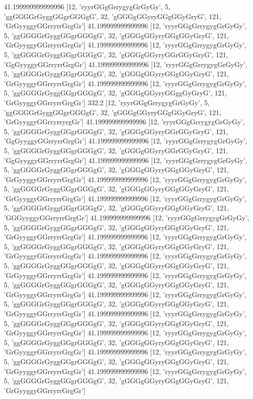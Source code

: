 41.199999999999996 [12, 'ryyrGGgGrrygygGrGyGy', 5, 'ggGGGGrGyggGGgrGGGgG', 32, 'gGGGgGGyryGGgGGyGryG', 121, 'GrGyyggyGGrryrrGrgGr']
41.199999999999996 [12, 'ryyrGGgGrrygygGrGyGy', 5, 'ggGGGGrGyggGGgrGGGgG', 32, 'gGGGgGGyryGGgGGyGryG', 121, 'GrGyyggyGGrryrrGrgGr']
41.199999999999996 [12, 'ryyrGGgGrrygygGrGyGy', 5, 'ggGGGGrGyggGGgrGGGgG', 32, 'gGGGgGGyryGGrGGyGryG', 121, 'GgGyyggyGGrryrrGrgGr']
41.199999999999996 [12, 'ryyrGGgGrrygygGrGyGy', 5, 'ggGGGGrGyggGGgrGGGgG', 32, 'gGGGgGGyryGGgGGyGryG', 121, 'GrGyyggyGGrryrrGrgGr']
41.199999999999996 [12, 'ryyrGGgGrrygygGrGyGy', 5, 'ggGGGGrGyggGGgrGGGgG', 32, 'gGGGgGGyryGGggGyGryG', 121, 'GrGyyggyGGrryrrGrgGr']
332.2 [12, 'ryyrGGgGrrygygGrGyGy', 5, 'ggGGGGrGyggGGgrGGGgG', 32, 'gGGGgGGyryGGgGGyGryG', 121, 'GrGyyggyGGrryrryrgGr']
41.199999999999996 [12, 'ryyrGGgGrrygygGrGyGy', 5, 'ggGGGGrGyggGGgrGGGgG', 32, 'gGGGgGGyryGGrGGyGryG', 121, 'GgGyyggyGGrryrrGrgGr']
41.199999999999996 [12, 'ryyrGGgGrrygygGrGyGy', 5, 'ggGGGGrGyggGGgrGGGgG', 32, 'gGGGgGGyryGGrGGyGryG', 121, 'GgGyyggyGGrryrrGrgGr']
41.199999999999996 [12, 'ryyrGGgGrrygygGrGyGy', 5, 'ggGGGGrGyggGGgrGGGgG', 32, 'gGGGgGGyryGGgGGyGryG', 121, 'GrGyyggyGGrryrrGrgGr']
41.199999999999996 [12, 'ryyrGGgGrrygygGrGyGy', 5, 'ggGGGGrGyggGGgrGGGgG', 32, 'gGGGgGGyryGGgGGyGryG', 121, 'GrGyyggyGGrryrrGrgGr']
41.199999999999996 [12, 'ryyrGGgGrrygygGrGyGy', 5, 'ggGGGGrGyggGGgrGGGgG', 32, 'gGGGgGGyryGGgGGyGryG', 121, 'GGGyyggyGGrryrrGrgGr']
41.199999999999996 [12, 'ryyrGGgGrrygygGrGyGy', 5, 'ggGGGGrGyggGGgrGGGgG', 32, 'gGGGgGGyryGGgGGyGryG', 121, 'GrGyyggyGGrryrrGrgGr']
41.199999999999996 [12, 'ryyrGGgGrrygygGrGyGy', 5, 'ggGGGGrGyggGGgrGGGgG', 32, 'gGGGgGGyryGGgGGyGryG', 121, 'GrGyyggyGGrryrrGrgGr']
41.199999999999996 [12, 'ryyrGGgGrrygygGrGyGy', 5, 'ggGGGGrGyggGGgrGGGgG', 32, 'gGGGgGGyryGGgGGyGryG', 121, 'GrGyyggyGGrryrrGrgGr']
41.199999999999996 [12, 'ryyrGGgGrrygygGrGyGy', 5, 'ggGGGGrGyggGGgrGGGgG', 32, 'gGGGgGGyryGGgGGyGryG', 121, 'GrGyyggyGGrryrrGrgGr']
41.199999999999996 [12, 'ryyrGGgGrrygygGrGyGy', 5, 'ggGGGGrGyggGGgrGGGgG', 32, 'gGGGgGGyryGGgGGyGryG', 121, 'GrGyyggyGGrryrrGrgGr']
41.199999999999996 [12, 'ryyrGGgGrrygygGrGyGy', 5, 'ggGGGGrGyggGGgrGGGgG', 32, 'gGGGgGGyryGGgGGyGryG', 121, 'GrGyyggyGGrryrrGrgGr']
41.199999999999996 [12, 'ryyrGGgGrrygygGrGyGy', 5, 'ggGGGGrGyggGGgrGGGgG', 32, 'gGGGgGGyryGGgGGyGryG', 121, 'GrGyyggyGGrryrrGrgGr']
41.199999999999996 [12, 'ryyrGGgGrrygygGrGyGy', 5, 'ggGGGGrGyggGGgrGGGgG', 32, 'gGGGgGGyryGGgGGyGryG', 121, 'GrGyyggyGGrryrrGrgGr']
41.199999999999996 [12, 'ryyrGGgGrrygygGrGyGy', 5, 'ggGGGGrGyggGGgrGGGgG', 32, 'gGGGgGGyryGGgGGyGryG', 121, 'GrGyyggyGGrryrrGrgGr']
